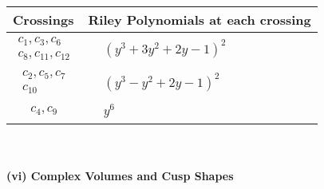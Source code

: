 \documentclass[1p]{elsarticle_modified}
\theoremstyle{definition}
\begin{document}
\begin{tabular}{m{50pt}|m{274pt}}
Crossings & \hspace{64pt}Riley Polynomials at each crossing \\
\hline $$\begin{aligned}c_{1},c_{3},c_{6}\\c_{8},c_{11},c_{12}\end{aligned}$$&$\begin{aligned}
&(y^3+3 y^2+2 y-1)^2
\end{aligned}$\\
\hline $$\begin{aligned}c_{2},c_{5},c_{7}\\c_{10}\end{aligned}$$&$\begin{aligned}
&(y^3- y^2+2 y-1)^2
\end{aligned}$\\
\hline $$\begin{aligned}c_{4},c_{9}\end{aligned}$$&$\begin{aligned}
&y^6
\end{aligned}$\\
\hline
\end{tabular}\\~\\
\newpage\flushleft \textbf{(vi) Complex Volumes and Cusp Shapes}
\end{document}
